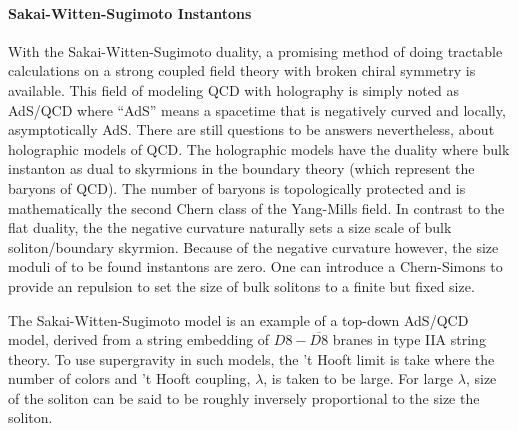 \documentclass[12pt]{article}
\begin{document}
\paragraph{Sakai-Witten-Sugimoto Instantons}


With the Sakai-Witten-Sugimoto duality, a promising method of doing tractable calculations on a strong coupled field theory with broken chiral symmetry is available.
This field of modeling QCD with holography is simply noted as AdS/QCD where ``AdS'' means a spacetime that is negatively curved and locally, asymptotically AdS.
There are still questions to be answers nevertheless, about holographic models of QCD.
The holographic models have the duality where bulk instanton as dual to skyrmions in the boundary theory (which represent the baryons of QCD).
The number of baryons is topologically protected and is mathematically the second Chern class of the Yang-Mills field.
In contrast to the flat duality, the the negative curvature naturally sets a size scale of bulk soliton/boundary skyrmion.
Because of the negative curvature however, the size moduli of to be found instantons are zero.
One can introduce a Chern-Simons to provide an repulsion to set the size of bulk solitons to a finite but fixed size.


The Sakai-Witten-Sugimoto model is an example of a top-down AdS/QCD model, derived from a string embedding of $D8-\overline{D8}$ branes in type IIA string theory.
To use supergravity in such models, the 't Hooft limit is take where the number of colors and 't Hooft coupling, $\lambda$, is taken to be large.
For large $\lambda$, size of the soliton can be said to be roughly inversely proportional to the size the soliton.
\end{document}
